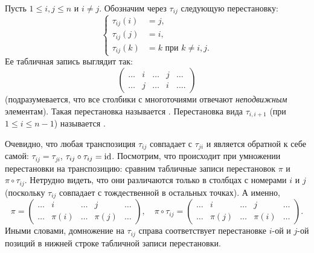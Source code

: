 \begin{definition}
Пусть $1\leq i,j\leq n$ и $i\neq j$. Обозначим через $\tau_{ij}$
следующую перестановку:
$$
\begin{cases}
\tau_{ij}(i)&=j,\\
\tau_{ij}(j)&=i,\\
\tau_{ij}(k)&=k\text{ при $k\neq i,j$}.
\end{cases}
$$
Ее табличная запись выглядит так:
$$
\begin{pmatrix}
\dots & i & \dots & j & \dots\\
\dots & j & \dots & i & \dots.
\end{pmatrix}
$$
(подразумевается, что все столбики с многоточиями отвечают {\it
  неподвижным} элементам).
Такая перестановка называется . Перестановка вида
$\tau_{i,i+1}$ (при $1\leq i\leq n-1$) называется .
\end{definition}
Очевидно, что любая транспозиция $\tau_{ij}$ совпадает с $\tau_{ji}$ и
является обратной к себе самой: $\tau_{ij}=\tau_{ji}$,
$\tau_{ij}\circ\tau_{ij}=\operatorname{id}$.
Посмотрим, что происходит при умножении перестановки на транспозицию:
сравним табличные записи перестановок $\pi$ и
$\pi\circ\tau_{ij}$. Нетрудно видеть, что они различаются только в
столбцах с номерами $i$ и $j$ (поскольку $\tau_{ij}$ совпадает с
тождественной в остальных точках). А именно,
$$
\pi=\begin{pmatrix}\dots & i & \dots & j & \dots\\
\dots & \pi(i) & \dots & \pi(j) & \dots\end{pmatrix},\quad
\pi\circ\tau_{ij}=\begin{pmatrix}\dots & i & \dots & j & \dots\\
\dots & \pi(j) & \dots & \pi(i) & \dots\end{pmatrix}.
$$
Иными словами, домножение на $\tau_{ij}$ справа соответствует
перестановке $i$-ой и $j$-ой позиций в нижней строке табличной записи
перестановки.

